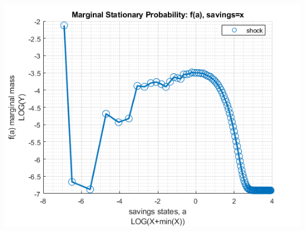 \documentclass[
]{book}
\begin{document}
\includegraphics[width=5.20833in,height=\textheight]{img/fx_ds_az_cts_loop_images/figure_1.png}
\end{document}
